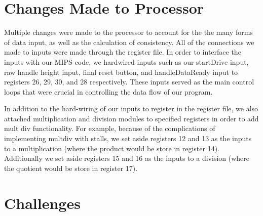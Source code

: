 \documentclass[letterpaper]{article} %
\begin{document}
\section{Changes Made to Processor}
Multiple changes were made to the processor to account for the the many forms of data input, as well as the calculation of consistency. All of the connections we made to inputs were made through the register file. In order to interface the inputs with our MIPS code, we hardwired inputs such as our startDrive input, raw handle height input, final reset button, and handleDataReady input to registers 26, 29, 30, and 28 respectively. These inputs served as the main control loops that were crucial in controlling the data flow of our program.

In addition to the hard-wiring of our inputs to register in the register file, we also attached multiplication and division modules to specified registers in order to add mult div functionality. For example, because of the complications of implementing multdiv with stalls, we set aside registers 12 and 13 as the inputs to a multiplication (where the product would be store in register 14). Additionally we set aside registers 15 and 16 as the inputs to a division (where the quotient would be store in register 17).

\section{Challenges}
\end{document}
